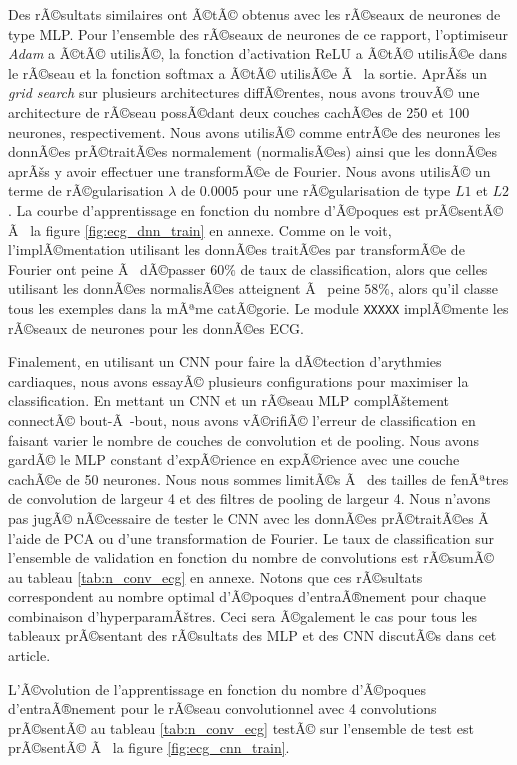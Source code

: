 \documentclass{article}
\begin{document}
Des rÃ©sultats similaires ont Ã©tÃ© obtenus avec les rÃ©seaux de neurones de type MLP. Pour l'ensemble des rÃ©seaux de neurones de ce rapport, l'optimiseur \textit{Adam} a Ã©tÃ© utilisÃ©, la fonction d'activation ReLU a Ã©tÃ© utilisÃ©e dans le rÃ©seau et la fonction softmax a Ã©tÃ© utilisÃ©e Ã  la sortie. AprÃšs un \textit{grid search} sur plusieurs architectures diffÃ©rentes, nous avons trouvÃ© une architecture de rÃ©seau possÃ©dant deux couches cachÃ©es de 250 et 100 neurones, respectivement. Nous avons utilisÃ© comme entrÃ©e des neurones les donnÃ©es prÃ©traitÃ©es normalement (normalisÃ©es) ainsi que les donnÃ©es aprÃšs y avoir effectuer une transformÃ©e de Fourier. Nous avons utilisÃ© un terme de rÃ©gularisation $\lambda$ de $0.0005$ pour une rÃ©gularisation de type $L1$ et $L2$. La courbe d'apprentissage en fonction du nombre d'Ã©poques est prÃ©sentÃ© Ã  la figure \ref{fig:ecg_dnn_train} en annexe. Comme on le voit, l'implÃ©mentation utilisant les donnÃ©es traitÃ©es par transformÃ©e de Fourier ont peine Ã  dÃ©passer $60\%$ de taux de classification, alors que celles utilisant les donnÃ©es normalisÃ©es atteignent Ã  peine $58\%$, alors qu'il classe tous les exemples dans la mÃªme catÃ©gorie. Le module \texttt{XXXXX} implÃ©mente les rÃ©seaux de neurones pour les donnÃ©es ECG.

Finalement, en utilisant un CNN pour faire la dÃ©tection d'arythmies cardiaques, nous avons essayÃ© plusieurs configurations pour maximiser la classification. En mettant un CNN et un rÃ©seau MLP complÃštement connectÃ© bout-Ã -bout, nous avons vÃ©rifiÃ© l'erreur de classification en faisant varier le nombre de couches de convolution et de pooling. Nous avons gardÃ© le MLP constant d'expÃ©rience en expÃ©rience avec une couche cachÃ©e de 50 neurones. Nous nous sommes limitÃ©s Ã  des tailles de fenÃªtres de convolution de largeur 4 et des filtres de pooling de largeur 4. Nous n'avons pas jugÃ© nÃ©cessaire de tester le CNN avec les donnÃ©es prÃ©traitÃ©es Ã  l'aide de PCA ou d'une transformation de Fourier. Le taux de classification sur l'ensemble de validation en fonction du nombre de convolutions est rÃ©sumÃ© au tableau \ref{tab:n_conv_ecg} en annexe. Notons que ces rÃ©sultats correspondent au nombre optimal d'Ã©poques d'entraÃ®nement pour chaque combinaison d'hyperparamÃštres. Ceci sera Ã©galement le cas pour tous les tableaux prÃ©sentant des rÃ©sultats des MLP et des CNN discutÃ©s dans cet article.


L'Ã©volution de l'apprentissage en fonction du nombre d'Ã©poques d'entraÃ®nement pour le rÃ©seau convolutionnel avec 4 convolutions prÃ©sentÃ© au tableau \ref{tab:n_conv_ecg} testÃ© sur l'ensemble de test est prÃ©sentÃ© Ã  la figure \ref{fig:ecg_cnn_train}.
\end{document}
